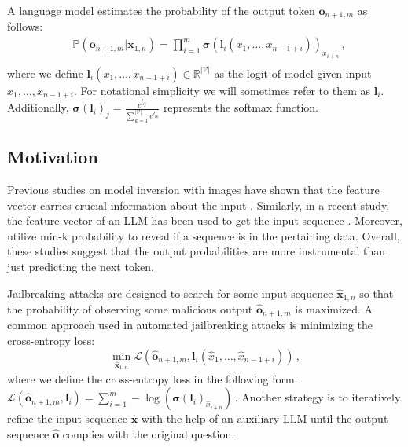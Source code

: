 A language model estimates the probability of the output token $\bm{o}_{n+1,m}$ as follows:
\begin{equation}
    \begin{aligned}
           & \mathbb{P}( \bm{o}_{n+1,m} |\bm{x}_{1,n})= \prod_{i=1}^m  \bm{\sigma}(\bm{l}_i(x_1,\dots, x_{n-1+i}))_{x_{i+n}}\,,\\
    \end{aligned}
\end{equation}
where we define $\bm{l}_i(x_1,\dots, x_{n-1+i}) \in \mathbb{R}^{\left | \mathcal{V} \right |}$ as the logit of model given input $x_1,\dots, x_{n-1+i}$. For notational simplicity we will sometimes refer to them as $\bm{l}_i$. 
Additionally, $\bm{\sigma}(\bm{l}_i)_{j} = \frac{e^{l_{ij}}}{\sum_{k=1}^{|\mathcal{V}|}e^{l_{ik}}}$ represents the softmax function.

\subsection{Motivation}
\label{subsec:motivation}

Previous studies on model inversion with images have shown that the feature vector carries crucial information about the input \citep{Dosovitskiy2015InvertingVR}. Similarly, in a recent study, the feature vector of an LLM has been used to get the input sequence \citep{morris2024language}. Moreover, \citet{shi2024detecting} utilize min-k probability to reveal if a sequence is in the pertaining data. Overall, these studies suggest that the output probabilities are more instrumental than just predicting the next token.

Jailbreaking attacks are designed to search for some input sequence $\hat{\bm{x}}_{1,n}$ so that the probability of observing some malicious output $\hat{\bm{o}}_{n+1,m}$ is maximized. A common approach used in automated jailbreaking attacks is minimizing the cross-entropy loss:
\begin{equation}
    \min_{\hat{\bm{x}}_{1,n}}\mathcal{L}(\hat{\bm{o}}_{n+1,m}, \bm{l}_{i}(\hat{x}_1,\dots, \hat{x}_{n-1+i}))\,,
    \label{eq:attack_problem}
\end{equation}
where we define the cross-entropy loss in the following form:
$\mathcal{L}(\hat{\bm{o}}_{n+1,m},\bm{l}_{i}) = \sum_{i=1}^{m} -\log\left(\bm{\sigma}(\bm{l}_i)_{\hat{x}_{i+n}}\right)\,.$ Another strategy is to iteratively refine the input sequence $\hat{\bm{x}}$ with the help of an auxiliary LLM until the output sequence $\hat{\bm{o}}$ complies with the original question. 

